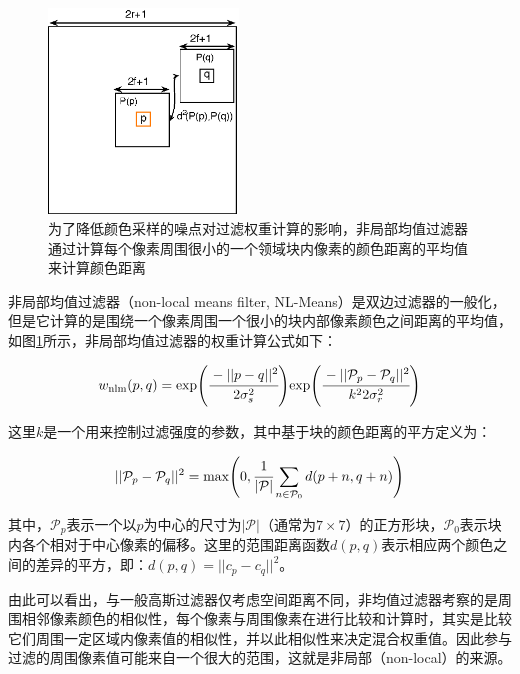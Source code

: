 \begin{figure}
	\sidecaption
	\includegraphics[width=0.45\textwidth]{figures/pt/nl-means}
	\caption{为了降低颜色采样的噪点对过滤权重计算的影响，非局部均值过滤器通过计算每个像素周围很小的一个领域块内像素的颜色距离的平均值来计算颜色距离}
	\label{f:pt-nl-means}
\end{figure}

非局部均值过滤器（non-local means filter, NL-Means）是双边过滤器的一般化，但是它计算的是围绕一个像素周围一个很小的块内部像素颜色之间距离的平均值，如图\ref{f:pt-nl-means}所示，非局部均值过滤器的权重计算公式如下：

\begin{equation}
	w_{\rm nlm}(p,q)=\text{exp}\Biggl(  \cfrac{-||p-q||^{2}}{2\sigma^{2}_{s}}\Biggl)\text{exp}\Biggl(  \cfrac{-||\mathcal{P}_p-\mathcal{P}_q||^{2}}{k^22\sigma^{2}_{r}}\Biggl)
\end{equation}

\noindent 这里$k$是一个用来控制过滤强度的参数，其中基于块的颜色距离的平方定义为：

\begin{equation}
	||\mathcal{P}_p-\mathcal{P}_q||^{2}=\max\Biggl( 0,  \cfrac{1}{|\mathcal{P}|}\sum_{n\in\mathcal{P}_0} d(p+n,q+n)\Biggl)
\end{equation}

\noindent 其中，$\mathcal{P}_p$表示一个以$p$为中心的尺寸为$|\mathcal{P}|$（通常为$7\times 7$）的正方形块，$\mathcal{P}_0$表示块内各个相对于中心像素的偏移。这里的范围距离函数$d(p,q)$表示相应两个颜色之间的差异的平方，即：$d(p,q)=||c_p-c_q||^{2}$。

由此可以看出，与一般高斯过滤器仅考虑空间距离不同，非均值过滤器考察的是周围相邻像素颜色的相似性，每个像素与周围像素在进行比较和计算时，其实是比较它们周围一定区域内像素值的相似性，并以此相似性来决定混合权重值。因此参与过滤的周围像素值可能来自一个很大的范围，这就是非局部（non-local）的来源。




